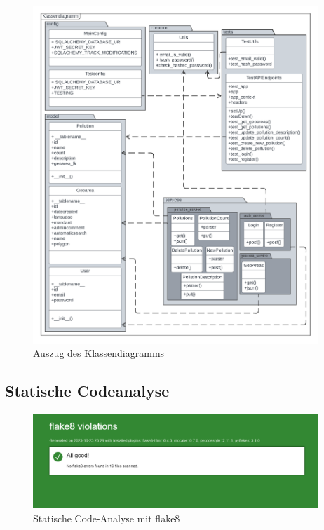 \documentclass[a4paper,12pt]{article}
\begin{document}
\begin{figure}[h]
\centering
\includegraphics[width=0.96\textwidth]{bilder/klassendiagramm.png}
\caption{Auszug des Klassendiagramms}
\end{figure}

\clearpage
\subsection{Statische Codeanalyse}
\label{sec:codeanalyse}

\begin{figure}[h]
\centering
\includegraphics[width=0.96\textwidth]{bilder/flake8.png}
\caption{Statische Code-Analyse mit flake8}
\end{figure}
\end{document}

